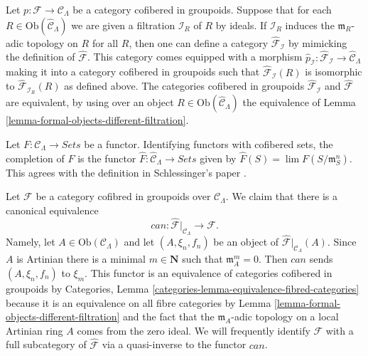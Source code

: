 \begin{remark}
\label{remark-different-sequence-ideals}
Let $p: \mathcal{F} \to \mathcal{C}_\Lambda$ be a category cofibered in 
groupoids. Suppose that for each
$R \in \text{Ob}(\widehat{\mathcal{C}}_\Lambda)$ we are given a filtration
$\mathcal{I}_R$ of $R$ by ideals. If
$\mathcal{I}_R$ induces the $\mathfrak m_R$-adic topology on $R$ for all $R$,
then one can define a category
$\widehat{\mathcal{F}}_\mathcal{I}$ by mimicking 
the definition of $\widehat{\mathcal{F}}$. This category comes equipped with a
morphism
$\widehat{p}_\mathcal{I} : \widehat{\mathcal{F}}_\mathcal{I} \to
\widehat{\mathcal{C}}_\Lambda$ making it into a category cofibered in 
groupoids such that $\widehat{\mathcal{F}}_\mathcal{I}(R)$ is isomorphic to 
$\widehat{\mathcal{F}}_{\mathcal{I}_R}(R)$ as defined above. The categories
cofibered in groupoids $\widehat{\mathcal{F}}_{\mathcal{I}}$ and 
$\widehat{\mathcal{F}}$ are equivalent, by using over an object
$R \in \text{Ob}(\widehat{\mathcal{C}}_\Lambda)$
the equivalence of
Lemma \ref{lemma-formal-objects-different-filtration}.
\end{remark}

\begin{remark}
\label{remark-completion-functor}
Let $F: \mathcal{C}_\Lambda \to \textit{Sets}$ be a functor.
Identifying functors with cofibered sets, the completion of $F$ is the functor 
$\widehat{F} : \widehat{\mathcal{C}}_\Lambda \to \textit{Sets}$ 
given by $\widehat{F}(S) = \lim F(S/\mathfrak{m}_{S}^{n})$.  This agrees 
with the definition in Schlessinger's paper \cite{Sch}.
\end{remark}

\begin{remark}
\label{remark-restrict-completion}
Let $\mathcal{F}$ be a category cofibred in groupoids over
$\mathcal{C}_\Lambda$. We claim that there is a canonical
equivalence
$$
can :
\widehat{\mathcal{F}}|_{\mathcal{C}_\Lambda}
\longrightarrow
\mathcal{F}.
$$
Namely, let $A \in \text{Ob}(\mathcal{C}_\Lambda)$ and let
$(A, \xi_n, f_n)$ be an object of
$\widehat{\mathcal{F}}|_{\mathcal{C}_\Lambda}(A)$.
Since $A$ is Artinian there is a minimal $m \in \mathbf{N}$
such that $\mathfrak m_A^m = 0$. Then $can$ sends $(A, \xi_n, f_n)$ to $\xi_m$.
This functor is an equivalence of categories cofibered in groupoids by
Categories, Lemma \ref{categories-lemma-equivalence-fibred-categories}
because it is an equivalence on all fibre categories by
Lemma \ref{lemma-formal-objects-different-filtration}
and the fact that the $\mathfrak m_A$-adic topology on a local
Artinian ring $A$ comes from the zero ideal. We will frequently identify
$\mathcal{F}$ with a full subcategory of $\widehat{\mathcal{F}}$ via a
quasi-inverse to the functor $can$.
\end{remark}

